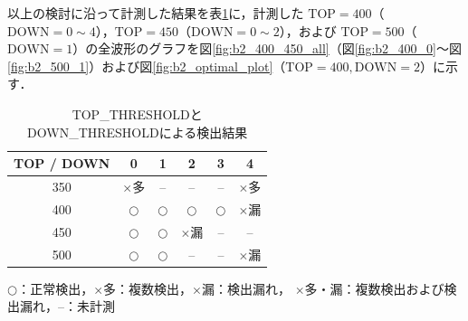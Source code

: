 以上の検討に沿って計測した結果を表\ref{tab:threshold_results}に，計測した $\mathrm{TOP} = 400$（$\mathrm{DOWN} = 0 \sim 4$），$\mathrm{TOP} = 450$（$\mathrm{DOWN} = 0 \sim 2$），および $\mathrm{TOP} = 500$（$\mathrm{DOWN} = 1$）の全波形のグラフを図\ref{fig:b2_400_450_all}（図\ref{fig:b2_400_0}〜図\ref{fig:b2_500_1}）および図\ref{fig:b2_optimal_plot}（$\mathrm{TOP} = 400, \mathrm{DOWN} = 2$）に示す．

\begin{table}[htbp]
  \centering
  \caption{TOP\_THRESHOLDとDOWN\_THRESHOLDによる検出結果}
  \label{tab:threshold_results}

  \setlength{\tabcolsep}{12pt}
  \renewcommand{\arraystretch}{1.5}

  \begin{tabular}{c|ccccc}
    \hline
    TOP / DOWN & 0          & 1          & 2          & 3          & 4         \\
    \hline
    350        & $\times$多  & --         & --         & --         & $\times$多 \\
    400        & $\bigcirc$ & $\bigcirc$ & $\bigcirc$ & $\bigcirc$ & $\times$漏 \\
    450        & $\bigcirc$ & $\bigcirc$ & $\times$漏  & --         & --        \\
    500        & $\bigcirc$ & $\bigcirc$ & --         & --         & $\times$漏 \\
    \hline
  \end{tabular}

  \vspace{1ex}

  \footnotesize
  $\bigcirc$：正常検出，$\times$多：複数検出，$\times$漏：検出漏れ，
  $\times$多・漏：複数検出および検出漏れ，--：未計測
\end{table}

